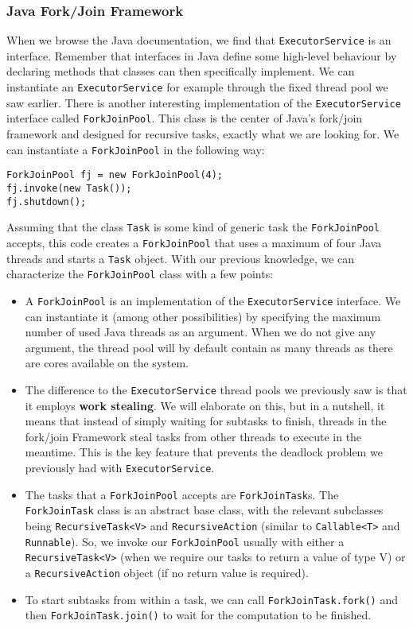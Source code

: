 \documentclass[main.tex]{subfiles}
\begin{document}
\subsubsection{Java Fork/Join Framework}
When we browse the Java documentation, we find that \texttt{ExecutorService} is an interface. Remember that interfaces in Java define some high-level behaviour by declaring methods that classes can then specifically implement. We can instantiate an \texttt{ExecutorService} for example through the fixed thread pool we saw earlier. There is another interesting implementation of the \texttt{ExecutorService} interface called \texttt{ForkJoinPool}. This class is the center of Java's fork/join framework and designed for recursive tasks, exactly what we are looking for. We can instantiate a \texttt{ForkJoinPool} in the following way:

\begin{verbatim}
ForkJoinPool fj = new ForkJoinPool(4);
fj.invoke(new Task());
fj.shutdown();
\end{verbatim}

\noindent Assuming that the class \texttt{Task} is some kind of generic task the \texttt{ForkJoinPool} accepts, this code creates a \texttt{ForkJoinPool} that uses a maximum of four Java threads and starts a \texttt{Task} object. With our previous knowledge, we can characterize the \texttt{ForkJoinPool} class with a few points:

\begin{itemize}
  \item A \texttt{ForkJoinPool} is an implementation of the \texttt{ExecutorService} interface. We can instantiate it (among other possibilities) by specifying the maximum number of used Java threads as an argument. When we do not give any argument, the thread pool will by default contain as many threads as there are cores available on the system.
  \item The difference to the \texttt{ExecutorService} thread pools we previously saw is that it employs \textbf{work stealing}. We will elaborate on this, but in a nutshell, it means that instead of simply waiting for subtasks to finish, threads in the fork/join Framework steal tasks from other threads to execute in the meantime. This is the key feature that prevents the deadlock problem we previously had with \texttt{ExecutorService}.
  \item The tasks that a \texttt{ForkJoinPool} accepts are \texttt{ForkJoinTask}s. The \texttt{ForkJoinTask} class is an abstract base class, with the relevant subclasses being \texttt{RecursiveTask<V>} and \texttt{RecursiveAction} (similar to \texttt{Callable<T>} and \texttt{Runnable}). So, we invoke our \texttt{ForkJoinPool} usually with either a \texttt{RecursiveTask<V>} (when we require our tasks to return a value of type V) or a \texttt{RecursiveAction} object (if no return value is required).
  \item To start subtasks from within a task, we can call \texttt{ForkJoinTask.fork()} and then \texttt{ForkJoinTask.join()} to wait for the computation to be finished.
\end{itemize}
\end{document}

